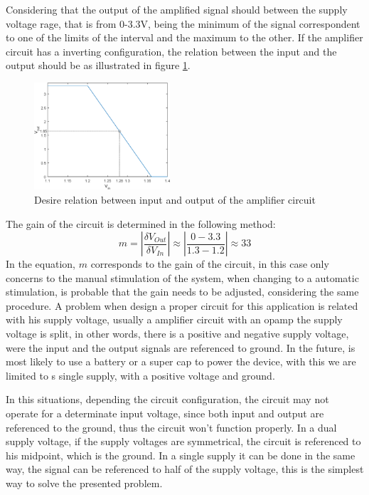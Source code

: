 Considering that the output of the amplified signal should between the supply voltage rage, that is from 0-3.3V, being the minimum of the signal correspondent to one of the limits of the interval and the maximum to the other. If the amplifier circuit has a inverting configuration, the relation between the input and the output should be as illustrated in figure \ref{fig:inVSout}.
\begin{figure}[]
    \centering
    \includegraphics[width=0.45\textwidth]{Chapters/4CHP/Figures/inOut.eps}
    \caption{Desire relation between input and output of the amplifier circuit}
    \label{fig:inVSout}
\end{figure}
The gain of the circuit is determined in the following method:
\begin{equation*}
   m = |\frac{\delta V_{Out}}{\delta V_{In}}| \approx |\frac{0-3.3}{1.3-1.2}| \approx 33
\end{equation*}
In the equation, $m$ corresponds to the gain of the circuit, in this case only concerns to the manual stimulation of the system, when changing to a automatic stimulation, is probable that the gain needs to be adjusted, considering the same procedure.
A problem when design a proper circuit for this application is related with his supply voltage, usually a amplifier circuit with an \acrshort{opamp} the supply voltage is split, in other words, there is a positive and negative supply voltage, were the input and the output signals are referenced to ground. In the future, is most likely to use a battery or a super cap to power the device, with this we are limited to s single supply, with a positive voltage and ground. 

In this situations, depending the circuit configuration, the circuit may not operate for a determinate input voltage, since both input and output are referenced to the ground, thus the circuit won't function properly. In a dual supply voltage, if the supply voltages are symmetrical, the circuit is referenced to his midpoint, which is the ground. In a single supply it can be done in the same way, the signal can be referenced to half of the supply voltage, this is the simplest way to solve the presented problem. 

